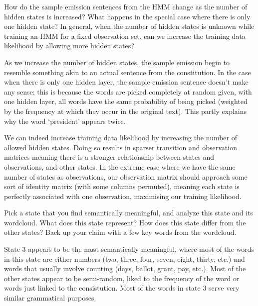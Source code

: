 \indent\problem[5] %
How do the sample emission sentences from the HMM change as the number of hidden states is increased? What happens in the special case where there is only one hidden state? In general, when the number of hidden states is unknown while training an HMM for a fixed observation set, can we increase the training data likelihood by allowing more hidden states?

\begin{solution}
  As we increase the number of hidden states, the sample emission begin to resemble something akin to an actual sentence from the constitution. In the case when there is only one hidden layer, the sample emission sentence doesn't make any sense; this is because the words are picked completely at random given, with one hidden layer, all words have the same probability of being picked (weighted by the frequency at which they occur in the original text). This partly explains why the word `president' appears twice. 

  We can indeed increase training data likelihood by increasing the number of allowed hidden states. Doing so results in sparser transition and observation matrices meaning there is a stronger relationship between states and observations, and other states. In the extreme case where we have the same number of states as observations, our observation matrix should approach some sort of identity matrix (with some columns permuted), meaning each state is perfectly associated with one observation, maximising our training likelihood.
\end{solution}


\indent\problem[5] %
Pick a state that you find semantically meaningful, and analyze this state and its wordcloud. What does this state represent? How does this state differ from the other states? Back up your claim with a few key words from the wordcloud.
\begin{solution}
  State 3 appears to be the most semantically meaningful, where most of the words in this state are either numbers (two, three, four, seven, eight, thirty, etc.) and words that usually involve counting (days, ballot, grant, pay, etc.). Most of the other states appear to be semi-random, liked to the frequency of the word or words just linked to the consistution. Most of the words in state 3 serve very similar grammatical purposes.
\end{solution}




